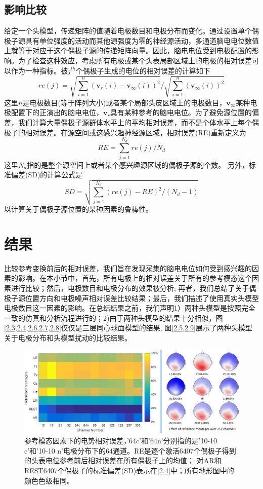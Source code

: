 \subsection{影响比较}
给定一个头模型，传递矩阵的值随着电极数目和电极分布而变化。通过设置单个偶极子源具有单位强度的活动而其他源强度为零的神经源活动，多通道脑电电位数值上就等于对应于这个偶极子源的传递矩阵向量。因此，脑电电位受到电极配置的影响。为了检查这种效应，考虑所有电极或某个头表局部区域上的电极的相对误差可以作为一种指标。被$j^{th}$个偶极子生成的电位的相对误差的计算如下
\begin{equation*}
re(j)=\sqrt{\sum_{i=1}^n(\mathbf{v}_r(i)-\mathbf{v}_{\infty}(i))^2}/\sqrt{\sum_{i=1}^n(\mathbf{v}_{\infty}(i))^2}
\end{equation*}
这里$n$是电极数目(等于阵列大小)或者某个局部头皮区域上的电极数目，$\mathbf{v}_{\infty}$某种电极配置下的正演出的脑电电位，$\mathbf{v}_r$具有某种参考的脑电电位。为了避免源位置的偏差，我们计算大量偶极子源群体水平上的平均相对误差，而不是个体水平上每个偶极子的相对误差。在源空间或这感兴趣神经源区域，相对误差(RE)重新定义为
\begin{equation*}
RE=\sum_{j=1}^{N_d}re(j)/{N_d}
\end{equation*}
这里$N_d$指的是整个源空间上或者某个感兴趣源区域的偶极子源的个数。 另外，标准偏差(SD)的计算公式是
\begin{equation*}
SD=\sqrt{\sum_{j=1}^{N_d}(re(j)-RE)^2/(N_d-1)}
\end{equation*}
以计算关于偶极子源位置的某种因素的鲁棒性。

\section{结果}
比较参考变换前后的相对误差，我们旨在发现采集的脑电电位如何受到感兴趣的因素的影响。在本小节中，首先，所有电极上的相对误差关于所有的参考模态这个因素进行比较；然后，电极数目和电极分布的效果被分析; 再者，我们总结了关于偶极子源位置方向和电极噪声相对误差比较结果；最后，我们描述了使用真实头模型电极数目这一因素的影响。在总结结果之前，我们声明1）两种头模型是按照完全一致的仿真和分析流程进行的；2)由于两种头模型的结果十分相似，图\cref{2.3,2.4,2.6,2.7,2.8}仅仅是三层同心球面模型的结果, 图\cref{2.5,2.9}展示了两种头模型关于电极分布和头模型扰动的比较结果。
\begin{figure}[h!]
	\centering
	\includegraphics[width=15cm]{pic/JNE/figure3.png}
	\caption{参考模态因素下的电势相对误差，'64c'和'64n'分别指的是'10-10 c'和'10-10 n'电极分布下的64通道。RE是逐个激活6407个偶极子得到的头表电位参考前后相对误差在所有偶极子上的均值； 对AR和REST6407个偶极子的标准偏差(SD)表示在\ref{2.4}中；所有地形图中的颜色色级相同。}
	\label{2.3}
\end{figure}

